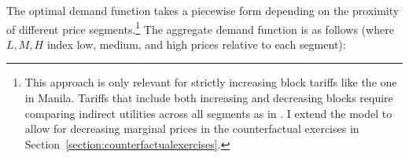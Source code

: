 \documentclass[12pt]{article}
\begin{document}
\begin{appendices}
The optimal demand function takes a piecewise form depending on the proximity of different price segments.\footnote{This approach is only relevant for strictly increasing block tariffs like the one in Manila.  Tariffs that include both increasing and decreasing blocks require comparing indirect utilities across all segments as in \cite{szabo2015value}.  I extend the model to allow for decreasing marginal prices in the counterfactual exercises in Section~\ref{section:counterfactualexercises}.}  The aggregate demand function is as follows (where $L,M,H$ index low, medium, and high prices relative to each segment):

\end{appendices}
\end{document}
